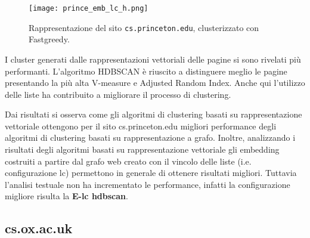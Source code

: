 \begin{figure}[ht!]
	\centering
	\texttt{[image: prince\_emb\_lc\_h.png]}
	\caption{Rappresentazione del sito \texttt{cs.princeton.edu}, clusterizzato con Fastgreedy.}
	\label{lc_emb_h}
\end{figure}

I cluster generati dalle rappresentazioni vettoriali delle pagine si sono rivelati più performanti. L'algoritmo HDBSCAN è riuscito a distinguere meglio le pagine presentando la più alta V-measure e Adjusted Random Index. Anche qui l'utilizzo delle liste ha contribuito a migliorare il processo di clustering.

Dai risultati si osserva come gli algoritmi di clustering basati su rappresentazione vettoriale ottengono per il sito cs.princeton.edu migliori performance degli algoritmi di clustering basati su rappresentazione a grafo.
Inoltre, analizzando i risultati degli algoritmi basati su rappresentazione vettoriale gli embedding costruiti a partire dal grafo web creato con il vincolo delle liste (i.e. configurazione lc) permettono in generale di ottenere risultati migliori.
Tuttavia l'analisi testuale non ha incrementato le performance, infatti la configurazione migliore risulta la \textbf{E-lc hdbscan}.


\subsection{cs.ox.ac.uk}

